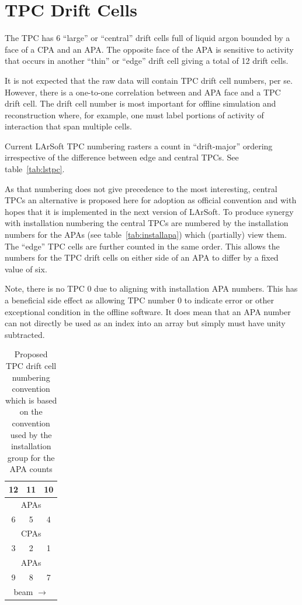 \documentclass[pdftex,12pt,letter]{article}
\begin{document}
\section{TPC Drift Cells}

The TPC has 6 ``large'' or ``central'' drift cells full of liquid
argon bounded by a face of a CPA and an APA.  The opposite face of the
APA is sensitive to activity that occurs in another ``thin'' or
``edge'' drift cell giving a total of 12 drift cells.

It is not expected that the raw data will contain TPC drift cell
numbers, per se.  However, there is a one-to-one correlation between
and APA face and a TPC drift cell.  The drift cell number is most
important for offline simulation and reconstruction where, for
example, one must label portions of activity of interaction that span
multiple cells.

Current LArSoft TPC numbering rasters a count in ``drift-major''
ordering irrespective of the difference between edge and central TPCs.
See table~\ref{tab:lstpc}.

As that numbering does not give precedence to the most interesting,
central TPCs an alternative is proposed here for adoption as official
convention and with hopes that it is implemented in the next version
of LArSoft.  To produce synergy with installation numbering the
central TPCs are numbered by the installation numbers for the APAs
(see table~\ref{tab:installapa}) which (partially) view them.  The
``edge'' TPC cells are further counted in the same order.  This allows
the numbers for the TPC drift cells on either side of an APA to differ
by a fixed value of six.

Note, there is no TPC 0 due to aligning with installation APA numbers.
This has a beneficial side effect as allowing TPC number 0 to indicate
error or other exceptional condition in the offline software.  It does
mean that an APA number can not directly be used as an index into an
array but simply must have unity subtracted.


\begin{table}[htp]
  \label{tab:tpc}
  \centering
  \begin{tabular}[h]{|c|c|c|}
    \hline\hline
    12 & 11 & 10\\
    \hline
    \hline
    \multicolumn{3}{|c|}{APAs}\\
    \hline
    \hline
    6 & 5 & 4 \\
    \hline
    \hline
    \multicolumn{3}{|c|}{CPAs}\\
    \hline
    \hline
    3 & 2 & 1 \\
    \hline
    \hline
    \multicolumn{3}{|c|}{APAs}\\
    \hline
    \hline
    9 & 8 & 7 \\
    \hline
    \hline
    \multicolumn{3}{c}{beam $\longrightarrow$} \\    

  \end{tabular}
  \caption{Proposed TPC drift cell numbering convention which is based
    on the convention used by the installation group for the APA
    counts}
\end{table}
\end{document}
